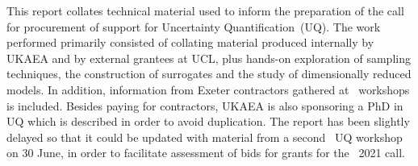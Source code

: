 This report collates technical material used to inform the preparation of the call for
procurement of support for Uncertainty Quantification~(UQ).
The work performed primarily consisted of collating material produced
internally by UKAEA and by external grantees at UCL, plus
hands-on exploration of sampling techniques, the construction of surrogates and the study
of dimensionally reduced models. In addition, information from Exeter contractors
gathered at \nep \ workshops is included. Besides paying for contractors, UKAEA is also 
sponsoring a PhD in UQ which is described in order to avoid duplication. The
report has been slightly delayed so that it could be updated with material from
a second \nep \ UQ workshop on 30 June, in order
to facilitate assessment of bids for grants for the \nep \ 2021 call.

